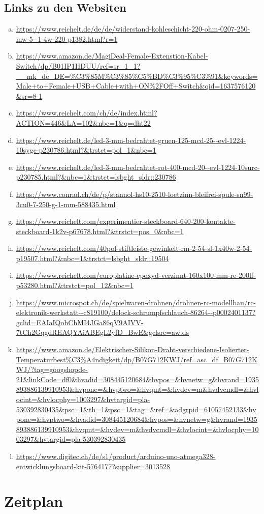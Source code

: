 \documentclass{paper}
\begin{document}
\subsection*{Links zu den Websiten}
\begin{enumerate}[(a)]
\item \url{https://www.reichelt.de/de/de/widerstand-kohleschicht-220-ohm-0207-250-mw-5--1-4w-220-p1382.html?r=1}
\item \url{https://www.amazon.de/MagiDeal-Female-Extenstion-Kabel-Switch/dp/B01IP1HDUU/ref=sr_1_1?__mk_de_DE=%C3%85M%C3%85%C5%BD%C3%95%C3%91&keywords=Male+to+Female+USB+Cable+with+ON%2FOff+Switch&qid=1637576120&sr=8-1}
\item \url{https://www.reichelt.com/ch/de/index.html?ACTION=446&LA=102&nbc=1&q=dht22}
\item \url{https://www.reichelt.de/led-3-mm-bedrahtet-gruen-125-mcd-25--evl-1224-10sygc-p230786.html?&trstct=pol_1&nbc=1}
\item \url{https://www.reichelt.de/led-3-mm-bedrahtet-rot-400-mcd-20--evl-1224-10surc-p230785.html?&nbc=1&trstct=lsbght_sldr::230786}
\item \url{https://www.conrad.ch/de/p/stannol-hs10-2510-loetzinn-bleifrei-spule-sn99-3cu0-7-250-g-1-mm-588435.html}
\item \url{https://www.reichelt.com/experimentier-steckboard-640-200-kontakte-steckboard-1k2v-p67678.html?&trstct=pos_0&nbc=1}
\item \url{https://www.reichelt.com/40pol-stiftleiste-gewinkelt-rm-2-54-sl-1x40w-2-54-p19507.html?&nbc=1&trstct=lsbght_sldr::19504}
\item \url{https://www.reichelt.com/europlatine-epoxyd-verzinnt-160x100-mm-re-200lf-p53280.html?&trstct=pol_12&nbc=1}
\item \url{https://www.microspot.ch/de/spielwaren-drohnen/drohnen-rc-modellbau/rc-elektronik-werkstatt--c819100/delock-schrumpfschlauch-86264--p0002401137?gclid=EAIaIQobChMI4JGa86qV9AIVV-7tCh2GqgdREAQYAiABEgL2yfD_BwE&gclsrc=aw.ds}
\item \url{https://www.amazon.de/Elektrischer-Silikon-Draht-verschiedene-Isolierter-Temperaturbest%C3%A4ndigkeit/dp/B07G712KWJ/ref=asc_df_B07G712KWJ/?tag=googshopde-21&linkCode=df0&hvadid=308445120684&hvpos=&hvnetw=g&hvrand=1935893886139910953&hvpone=&hvptwo=&hvqmt=&hvdev=m&hvdvcmdl=&hvlocint=&hvlocphy=1003297&hvtargid=pla-530392830435&psc=1&th=1&psc=1&tag=&ref=&adgrpid=61057452133&hvpone=&hvptwo=&hvadid=308445120684&hvpos=&hvnetw=g&hvrand=1935893886139910953&hvqmt=&hvdev=m&hvdvcmdl=&hvlocint=&hvlocphy=1003297&hvtargid=pla-530392830435}
\item \url{https://www.digitec.ch/de/s1/product/arduino-uno-atmega328-entwicklungsboard-kit-5764177?supplier=3013528}
\end{enumerate}
\newpage
\section*{Zeitplan}

\end{document}

